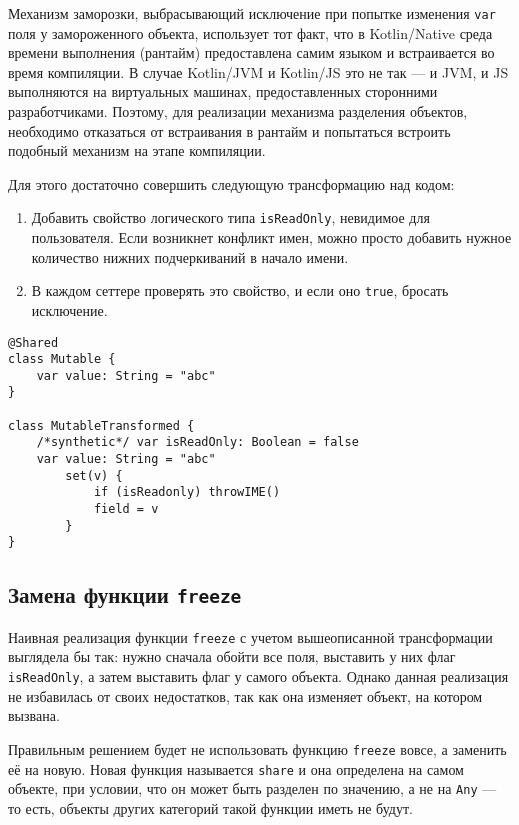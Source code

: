 \documentclass[specification,annotation,times]{itmo-student-thesis}
\begin{document}
Механизм заморозки, выбрасывающий исключение при попытке изменения \texttt{var} поля у замороженного объекта, использует тот факт, что в Kotlin/Native среда времени выполнения (рантайм) предоставлена самим языком и встраивается во время компиляции.
В случае Kotlin/JVM и Kotlin/JS это не так –-- и JVM, и JS выполняются на виртуальных машинах, предоставленных сторонними разработчиками.
Поэтому, для реализации механизма разделения объектов, необходимо отказаться от встраивания в рантайм и попытаться встроить подобный механизм на этапе компиляции.

Для этого достаточно совершить следующую трансформацию над кодом: 

\begin{enumerate}
	\item Добавить свойство логического типа \texttt{isReadOnly}, невидимое для пользователя. Если возникнет конфликт имен, можно просто добавить нужное количество нижних подчеркиваний в начало имени.
	\item В каждом сеттере проверять это свойство, и если оно \texttt{true}, бросать исключение.
\end{enumerate}

\begin{lstlisting}[float=h!,caption={Код до и после трансформации}]
@Shared
class Mutable {
	var value: String = "abc"
}

class MutableTransformed {
	/*synthetic*/ var isReadOnly: Boolean = false
	var value: String = "abc"
		set(v) {
			if (isReadonly) throwIME() 
			field = v
		}
}
\end{lstlisting}

\subsection{Замена функции \texttt{freeze}}\label{def_share}

Наивная реализация функции \texttt{freeze} с учетом вышеописанной трансформации выглядела бы так: нужно сначала обойти все поля, выставить у них флаг \texttt{isReadOnly}, а затем выставить флаг у самого объекта.
Однако данная реализация не избавилась от своих недостатков, так как она изменяет объект, на котором вызвана.

Правильным решением будет не использовать функцию \texttt{freeze} вовсе, а заменить её на новую. Новая функция называется \texttt{share} и она определена на самом объекте, при условии, что он может быть разделен по значению, а не на \texttt{Any} --- то есть, объекты других категорий такой функции иметь не будут.
\end{document}
